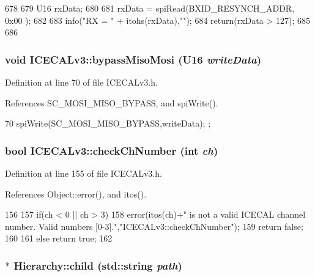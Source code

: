 \begin{DoxyCode}
678 {
679     U16 rxData;
680 
681     rxData = spiRead(BXID_RESYNCH_ADDR, 0x00 );
682 
683     info("RX = " + itohs(rxData),"");
684     return(rxData > 127);
685 
686 }
\end{DoxyCode}
\hypertarget{classICECALv3_a5ce36881aa89fedf7c37e03620acca6e}{
\subsubsection[{bypassMisoMosi}]{\setlength{\rightskip}{0pt plus 5cm}void ICECALv3::bypassMisoMosi ({\bf U16} {\em writeData})}}
\label{classICECALv3_a5ce36881aa89fedf7c37e03620acca6e}


Definition at line 70 of file ICECALv3.h.

References SC\_\-MOSI\_\-MISO\_\-BYPASS, and spiWrite().


\begin{DoxyCode}
70 {       spiWrite(SC_MOSI_MISO_BYPASS,writeData);    };
\end{DoxyCode}
\hypertarget{classICECALv3_a8753a74558f988b346a3fe350c5bbad4}{
\subsubsection[{checkChNumber}]{\setlength{\rightskip}{0pt plus 5cm}bool ICECALv3::checkChNumber (int {\em ch})}}
\label{classICECALv3_a8753a74558f988b346a3fe350c5bbad4}


Definition at line 155 of file ICECALv3.h.

References Object::error(), and itos().


\begin{DoxyCode}
156     {
157         if(ch < 0 || ch > 3) {
158             error(itos(ch)+" is not a valid ICECAL channel number. Valid numbers 
      [0-3].","ICECALv3::checkChNumber");
159             return false;
160         }
161         else return true;
162     }
\end{DoxyCode}
\hypertarget{classHierarchy_a1e207f973c694b538bf90107b4868817}{
\subsubsection[{child}]{ $\ast$ Hierarchy::child (std::string {\em path})}}
\label{classHierarchy_a1e207f973c694b538bf90107b4868817}


